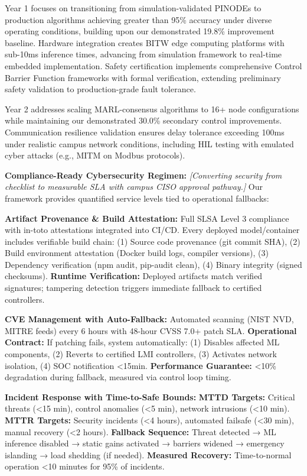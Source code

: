 \documentclass[12pt]{article}
\begin{document}
Year 1 focuses on transitioning from simulation-validated PINODEs to production algorithms achieving greater than 95\% accuracy under diverse operating conditions, building upon our demonstrated 19.8\% improvement baseline. Hardware integration creates BITW edge computing platforms with sub-10ms inference times, advancing from simulation framework to real-time embedded implementation. Safety certification implements comprehensive Control Barrier Function frameworks with formal verification, extending preliminary safety validation to production-grade fault tolerance.

Year 2 addresses scaling MARL-consensus algorithms to 16+ node configurations while maintaining our demonstrated 30.0\% secondary control improvements. Communication resilience validation ensures delay tolerance exceeding 100ms under realistic campus network conditions, including HIL testing with emulated cyber attacks (e.g., MITM on Modbus protocols).

\textbf{Compliance-Ready Cybersecurity Regimen:} \textit{[Converting security from checklist to measurable SLA with campus CISO approval pathway.]} Our framework provides quantified service levels tied to operational fallbacks:

\textbf{Artifact Provenance \& Build Attestation:} Full SLSA Level 3 compliance with in-toto attestations integrated into CI/CD. Every deployed model/container includes verifiable build chain: (1) Source code provenance (git commit SHA), (2) Build environment attestation (Docker build logs, compiler versions), (3) Dependency verification (npm audit, pip-audit clean), (4) Binary integrity (signed checksums). \textbf{Runtime Verification:} Deployed artifacts match verified signatures; tampering detection triggers immediate fallback to certified controllers.

\textbf{CVE Management with Auto-Fallback:} Automated scanning (NIST NVD, MITRE feeds) every 6 hours with 48-hour CVSS 7.0+ patch SLA. \textbf{Operational Contract:} If patching fails, system automatically: (1) Disables affected ML components, (2) Reverts to certified LMI controllers, (3) Activates network isolation, (4) SOC notification <15min. \textbf{Performance Guarantee:} <10\% degradation during fallback, measured via control loop timing.

\textbf{Incident Response with Time-to-Safe Bounds:} \textbf{MTTD Targets:} Critical threats (<15 min), control anomalies (<5 min), network intrusions (<10 min). \textbf{MTTR Targets:} Security incidents (<4 hours), automated failsafe (<30 min), manual recovery (<2 hours). \textbf{Fallback Sequence:} Threat detected → ML inference disabled → static gains activated → barriers widened → emergency islanding → load shedding (if needed). \textbf{Measured Recovery:} Time-to-normal operation <10 minutes for 95\% of incidents.
\end{document}
